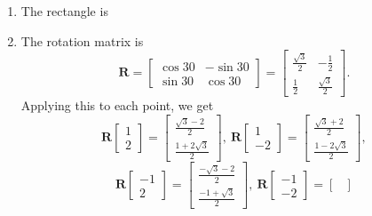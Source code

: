\begin{sol}
\begin{enumerate}
    \item The rectangle is
    \begin{center}
    \end{center}
    
    \item The rotation matrix is
    $$\mathbf{R} = \begin{bmatrix}
    \cos 30 & -\sin 30 \\ \sin 30 & \cos 30
    \end{bmatrix} = \begin{bmatrix}
    \frac{\sqrt{3}}{2} & -\frac12 \\ \frac12 & \frac{\sqrt{3}}{2}
    \end{bmatrix}.$$
    Applying this to each point, we get
    $$\mathbf{R}\begin{bmatrix}
    1 \\ 2
    \end{bmatrix} = \begin{bmatrix}
    \frac{\sqrt{3}-2}{2} \\ \frac{1 + 2\sqrt{3}}{2}
    \end{bmatrix}, \
    \mathbf{R}\begin{bmatrix}
    1 \\ -2
    \end{bmatrix} = \begin{bmatrix}
    \frac{\sqrt{3}+2}{2} \\ \frac{1 - 2\sqrt{3}}{2}
    \end{bmatrix},$$
    $$\mathbf{R}\begin{bmatrix}
    -1 \\ 2
    \end{bmatrix} = \begin{bmatrix}
    \frac{-\sqrt{3}-2}{2} \\ \frac{-1 + \sqrt{3}}{2}
    \end{bmatrix}, \
    \mathbf{R}\begin{bmatrix}
    -1 \\ -2
    \end{bmatrix} = \begin{bmatrix}

\end{bmatrix}$$
\end{enumerate}
\end{sol}
